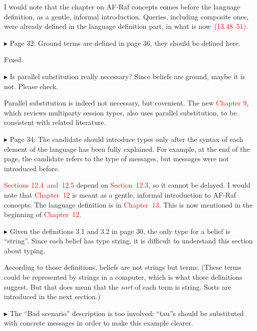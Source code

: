 \documentclass{article}
\newcommand*\R[1]{\textcolor{red}{#1}} %
\newcommand{\todo}[1]{[\textcolor{green}{TODO}: #1]}
\newenvironment{them}%
  {\bigskip\noindent\begingroup\color{blue}$\blacktriangleright$\enspace}%
  {\endgroup\par}
\begin{document}
I would note that the chapter on AF-Raf concepts
  comes before the language definition,
  as a gentle, informal introduction.
Queries, including composite ones,
  were already defined in the language definition part,
  in what is now~\R{(13.48--51)}.

\begin{them}
Page 32:
Ground terms are defined in page 36, they should be defined here.
\end{them}
Fixed.

\begin{them}
Is parallel substitution really necessary? Since beliefs are ground, maybe it
is not. Please check.
\end{them}

Parallel substitution is indeed not necessary, but covenient.
The new \R{Chapter 9},
  which reviews multiparty session types,
  also uses parallel substitution,
    to be consistent with related literature.


\begin{them}
Page 34:
The candidate should introduce types only after the syntax of each element of
the language has been fully explained. For example, at the end of the page, the
candidate refers to the type of messages, but messages were not introduced
before.
\end{them}

\R{Sections 12.4~and~12.5} depend on \R{Section~12.3},
  so it cannot be delayed.
I would note that \R{Chapter~12} is meant as a gentle, informal
  introduction to AF-Raf concepts.
The language definition is in \R{Chapter~13}.
This is now mentioned in the beginning of \R{Chapter~12}.

\begin{them}
Given the definitions 3.1 and 3.2 in page 30, the only type for a belief is
``string''. Since each belief has type string, it is difficult to understand this
section about typing.
\end{them}
According to those definitions,
  beliefs are not strings but terms.
(These terms could be represented by strings in a computer,
  which is what those definitions suggest.
But that does mean that the \emph{sort} of each term is string.
Sorts are introduced in the next section.)

\begin{them}
The ``Bad scenario'' description is too involved: ``tau''s should be substituted
with concrete messages in order to make this example clearer.
\end{them}
\todo{}
\end{document}

